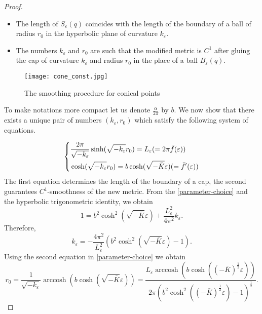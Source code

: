 \documentclass[12pt]{article}
\numberwithin{equation}{section}
\theoremstyle{definition}
\newcommand{\eps}{\varepsilon}
\DeclareMathOperator{\arccosh}{arccosh}
\begin{document}
\begin{proof}
\begin{itemize}
 \item The length of $S_{\eps}(q)$ coincides with the length of the boundary of a ball of radius $r_0$ in the hyperbolic plane of curvature $k_\eps$. 
 \item The numbers $k_\eps$ and $r_0$ are such that the modified metric is $C^1$ after gluing the cap of curvature $k_\eps$ and radius $r_0$ in the place of a ball $B_\eps(q)$.
 \end{itemize}

\begin{figure}
  \centering
  \texttt{[image: cone\_const.jpg]}
    \caption{The smoothing procedure for conical points}
    \label{fig:cone_const_smooth}
\end{figure}

To make notations more compact let us denote $\frac{\alpha}{2\pi}$ by $b$. We now show that there exists a unique pair of numbers $(k_\eps, r_0)$ which satisfy the following system of equations.

\begin{equation}\label{parameter-choice}
\left\{
\begin{aligned}
&\frac{2\pi}{\sqrt{-k_\eps}}\sinh(\sqrt{-k_\eps}r_0) = L_\eps (=2\pi \bar f(\eps)) \hfill \\
&\cosh(\sqrt{-k_\eps}r_0) = b\cosh(\sqrt{-\bar K}\eps)(=\bar f'(\eps)) \hfill \end{aligned}
\right.
\end{equation}
The first equation determines the length of the boundary of a cap, the second guarantees  $C^1$-smoothness of the new metric.
From the \eqref{parameter-choice} and the hyperbolic trigonometric identity, we obtain 
\begin{equation}\label{glue-curvature}
1 = b^2\cosh^2(\sqrt{-\bar K}\eps)+\frac{L^2_\eps}{4\pi^2}k_\eps.
\end{equation} 
Therefore, 
\begin{equation}\label{curvature-glue}
k_\eps = -\frac{4\pi^2}{L^2_\eps}(b^2\cosh^2(\sqrt{-\bar K}\eps)-1).
\end{equation} 
Using the second equation in \eqref{parameter-choice} we obtain
\begin{equation}
r_0 = \frac{1}{\sqrt{-k_\eps}}\arccosh\left(b\cosh(\sqrt{-\bar K}\eps)\right) = \frac{L_\eps\arccosh\left(b\cosh\left(\left(-\bar K\right)^\frac{1}{2}\eps\right)\right)}{2\pi\left(b^2\cosh^2\left(\left(-\bar K\right)^\frac{1}{2}\eps\right)-1\right)^\frac{1}{2}}.
\end{equation}


\end{proof}
\end{document}
